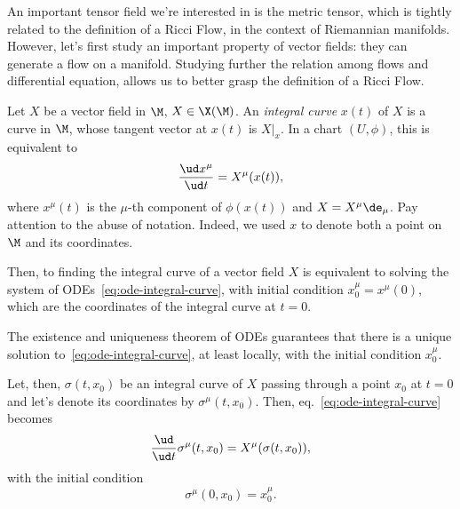 An important tensor field we're interested in is the metric tensor, which is tightly related to the definition of a Ricci Flow, in the context of Riemannian manifolds. However, let's first study an important property of vector fields: they can generate a flow on a manifold. Studying further the relation among flows and differential equation, allows us to better grasp the definition of a Ricci Flow.







Let $X$ be a vector field in $\M$, $X \in \X(\M)$. An \emph{integral curve} $x(t)$ of $X$ is a curve in $\M$, whose tangent vector at $x(t)$ is $X|_x$. In a chart $(U,\phi)$, this is equivalent to
\begin{equation}\label{eq:ode-integral-curve}
	\frac{\ud x^\mu}{\ud t} = X^\mu(x(t)) ,
\end{equation}
where $x^\mu(t)$ is the $\mu$-th component of $\phi(x(t))$ and $X = X^\mu \de_\mu$. Pay attention to the abuse of notation. Indeed, we used $x$ to denote both a point on $\M$ and its coordinates.

Then, to finding the integral curve of a vector field $X$ is equivalent to solving the system of ODEs~\eqref{eq:ode-integral-curve}, with initial condition $x^\mu_0 = x^\mu (0)$, which are the coordinates of the integral curve at $t=0$.

The existence and uniqueness theorem of ODEs guarantees that there is a unique solution to~\eqref{eq:ode-integral-curve}, at least locally, with the initial condition $x^\mu_0$.

Let, then, $\sigma(t,x_0)$ be an integral curve of $X$ passing through a point $x_0$ at $t=0$ and let's denote its coordinates by $\sigma^\mu(t,x_0)$. Then, eq.~\eqref{eq:ode-integral-curve} becomes
\begin{equation}\label{eq:ode-flow-coordinates}
	\frac{\ud}{\ud t} \sigma^\mu (t,x_0) = X^\mu (\sigma(t,x_0)),
\end{equation}
with the initial condition
\begin{equation}\label{eq:ode-flow-initial-condition}
	\sigma^\mu(0,x_0) = x^\mu_0.
\end{equation}

